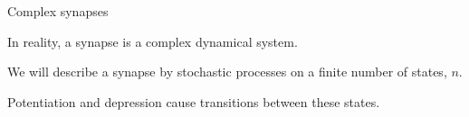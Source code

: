 \documentclass[final,hyperref={pdfpagelabels=false,bookmarks=false}]{beamer}
\begin{document}
\begin{frame}{}
\begin{columns}[t]
\begin{column}{0.27\linewidth}
\begin{block}{Complex synapses}
%
 \begin{minipage}[t]{14.5cm}
   In reality, a synapse is a complex dynamical system.

   \vp We will describe a synapse by stochastic processes on a finite number of states, $n$.

   \vp Potentiation and depression cause transitions between these states.

   \vp
   \begin{center}
   \end{center}
 \end{minipage}
 \begin{minipage}[t]{15.5cm}
   \begin{center}
   \end{center}


\end{minipage}
\end{block}
\end{column}
\end{columns}
\end{frame}
\end{document}
